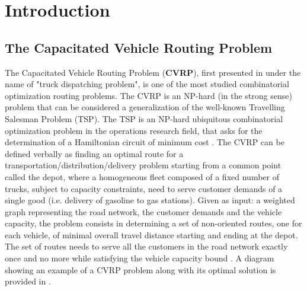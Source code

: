 \chapter{Introduction}
\label{sec:introduction-chapter}

\section{The Capacitated Vehicle Routing Problem}
\label{sec:intro-cvrp-problem}

The Capacitated Vehicle Routing Problem (\textbf{CVRP}), first presented in \textcite{dantzig1959}
under the name of "truck dispatching problem",
is one of the most studied combinatorial optimization routing problems.
The CVRP is an NP-hard (in the strong sense) problem
that can be considered a generalization of the well-known Travelling Salesman Problem (TSP).
The TSP \parencite{flood1956}
is an NP-hard \parencite{garey1976planar} ubiquitous combinatorial optimization problem in the operations research field,
that asks for the determination of a Hamiltonian circuit of minimum cost
\parencite{croes1958, laporte1992,johnson1997,applegate2006,gutin2006,hoffman2013}.
The CVRP can be defined verbally as finding an optimal route for a transportation/distribution/delivery problem
starting from a common point called the depot,
where a homogeneous fleet composed of a fixed number of trucks, subject to capacity constraints,
need to serve customer demands of a single good (i.e. delivery of gasoline to gas stations).
Given as input: a weighted graph representing the road network,
the customer demands and the vehicle capacity,
the problem consists in determining a set of non-oriented routes, one for each vehicle,
of minimal overall travel distance starting and ending at the depot.
The set of routes needs to serve all the customers in the road network exactly once and no more
while satisfying the vehicle capacity bound \parencite{toth2014}.
A diagram showing an example of a CVRP problem along with its optimal solution
is provided in .

